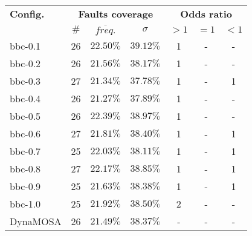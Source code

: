 \begin{tabular}{ l | c c c | c c c }
\textbf{Config.} & \multicolumn{3}{c|}{\textbf{Faults coverage}} & \multicolumn{3}{c}{\textbf{Odds ratio}} \\ 
  & $\#$ & $\overline{freq.}$ & $\sigma$ & $>1$ & $=1$ & $<1$ \\ 
\hline 
bbc-0.1 & 26 & $22.50\%$ & $39.12\%$ & 1 & - & - \\ 
bbc-0.2 & 26 & $21.56\%$ & $38.17\%$ & 1 & - & - \\ 
bbc-0.3 & 27 & $21.34\%$ & $37.78\%$ & 1 & - & 1 \\ 
bbc-0.4 & 26 & $21.27\%$ & $37.89\%$ & 1 & - & - \\ 
bbc-0.5 & 26 & $22.39\%$ & $38.97\%$ & 1 & - & - \\ 
bbc-0.6 & 27 & $21.81\%$ & $38.40\%$ & 1 & - & 1 \\ 
bbc-0.7 & 25 & $22.03\%$ & $38.11\%$ & 1 & - & 1 \\ 
bbc-0.8 & 27 & $22.17\%$ & $38.85\%$ & 1 & - & 1 \\ 
bbc-0.9 & 25 & $21.63\%$ & $38.38\%$ & 1 & - & 1 \\ 
bbc-1.0 & 25 & $21.92\%$ & $38.50\%$ & 2 & - & - \\ 
DynaMOSA & 26 & $21.49\%$ & $38.37\%$ & - & - & - \\ 
\end{tabular}